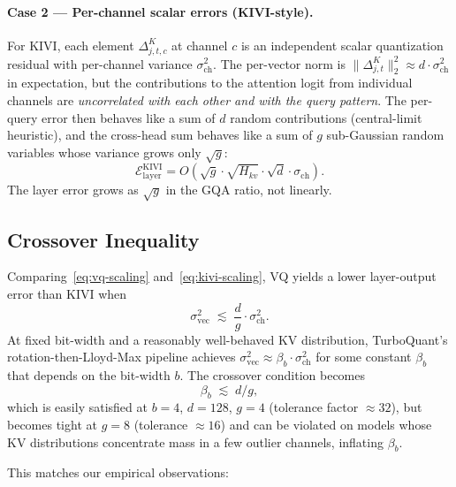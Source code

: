 \paragraph{Case 2 — Per-channel scalar errors (KIVI-style).}
For KIVI, each element $\Delta^K_{j,t,c}$ at channel $c$ is an independent
scalar quantization residual with per-channel variance
$\sigma_{\mathrm{ch}}^2$. The per-vector norm is
$\|\Delta^K_{j,t}\|_2^2 \approx d \cdot \sigma_{\mathrm{ch}}^2$ in expectation,
but the contributions to the attention logit from individual channels are
\emph{uncorrelated with each other and with the query pattern}. The
per-query error then behaves like a sum of $d$ random contributions
(central-limit heuristic), and the cross-head sum behaves like a sum of $g$
sub-Gaussian random variables whose variance grows only $\sqrt{g}$:
\begin{equation}
\label{eq:kivi-scaling}
\mathcal{E}_{\mathrm{layer}}^{\mathrm{KIVI}} = O\!\left( \sqrt{g} \cdot \sqrt{H_{kv}} \cdot \sqrt{d} \cdot \sigma_{\mathrm{ch}} \right).
\end{equation}
The layer error grows as $\sqrt{g}$ in the GQA ratio, not linearly.

\subsection{Crossover Inequality}
\label{sec:theory-crossover}

Comparing~\eqref{eq:vq-scaling} and~\eqref{eq:kivi-scaling}, VQ yields a
lower layer-output error than KIVI when
\begin{equation}
\label{eq:crossover}
\sigma_{\mathrm{vec}}^2 \;\lesssim\; \frac{d}{g} \cdot \sigma_{\mathrm{ch}}^2.
\end{equation}
At fixed bit-width and a reasonably well-behaved KV distribution, TurboQuant's
rotation-then-Lloyd-Max pipeline achieves $\sigma_{\mathrm{vec}}^2 \approx
\beta_b \cdot \sigma_{\mathrm{ch}}^2$ for some constant $\beta_b$ that depends
on the bit-width $b$. The crossover condition becomes
\begin{equation}
\label{eq:crossover-b}
\beta_b \;\lesssim\; d / g,
\end{equation}
which is easily satisfied at $b = 4$, $d = 128$, $g = 4$ (tolerance factor
$\approx 32$), but becomes tight at $g = 8$ (tolerance $\approx 16$) and
can be violated on models whose KV distributions concentrate mass in a few
outlier channels, inflating $\beta_b$.

This matches our empirical observations:

